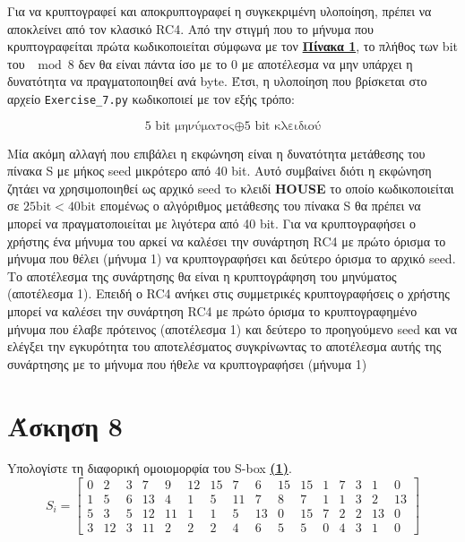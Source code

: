 \documentclass[12pt]{article}
\begin{document}
Για να κρυπτογραφεί και αποκρυπτογραφεί η συγκεκριμένη υλοποίηση, πρέπει να αποκλείνει από τον κλασικό RC4. Από την στιγμή που το μήνυμα που κρυπτογραφείται πρώτα κωδικοποιείται σύμφωνα με τον \textbf{\protect\hyperref[πίνακας 1]{Πίνακα 1}}, το πλήθος των bit του \( \mod 8\) δεν θα είναι πάντα ίσο με το 0 με αποτέλεσμα να μην υπάρχει η δυνατότητα να πραγματοποιηθεί \oplus ανά byte. Έτσι, η υλοποίηση που βρίσκεται στο αρχείο \texttt{Exercise\_7.py} κωδικοποιεί με τον εξής τρόπο: 
\begin{center}
    \begin{equation*}
        \text{5 bit μηνύματος} \oplus \text{5 bit κλειδιού}
    \end{equation*}
\end{center}
Μία ακόμη αλλαγή που επιβάλει η εκφώνηση είναι η δυνατότητα μετάθεσης του πίνακα S με μήκος seed μικρότερο από 40 bit. Αυτό συμβαίνει διότι η εκφώνηση ζητάει να χρησιμοποιηθεί ως αρχικό seed τo κλειδί \textbf{HOUSE} το οποίο κωδικοποιείται σε 
\newline
\( 25 \text{bit} < 40 \text{bit} \) επομένως ο αλγόριθμος μετάθεσης του πίνακα S θα πρέπει να μπορεί να πραγματοποιείται με λιγότερα από 40 bit.
\newline
\newline
Για να κρυπτογραφήσει ο χρήστης ένα μήνυμα του αρκεί να καλέσει την συνάρτηση RC4 με πρώτο όρισμα το μήνυμα που θέλει (μήνυμα 1) να κρυπτογραφήσει και δεύτερο όρισμα το αρχικό seed. Το αποτέλεσμα της συνάρτησης θα είναι η κρυπτογράφηση του μηνύματος (αποτέλεσμα 1).
\newline
\newline
Επειδή ο RC4 ανήκει στις συμμετρικές κρυπτογραφήσεις ο χρήστης μπορεί να καλέσει την συνάρτηση RC4 με πρώτο όρισμα το κρυπτογραφημένο μήνυμα που έλαβε πρότεινος (αποτέλεσμα 1) και δεύτερο το προηγούμενο seed και να ελέγξει την εγκυρότητα του αποτελέσματος συγκρίνωντας το αποτέλεσμα αυτής της συνάρτησης με το μήνυμα που ήθελε να κρυπτογραφήσει (μήνυμα 1) 
\hfill \blacksquare

\section*{Άσκηση 8}
Yπολογίστε τη διαφορική ομοιομορφία του S-box \textbf{\protect\hyperref[sbox 1]{(1)}}.
\begin{equation}
\label{sbox 1}
    S_i =
    \left[
    \begin{array}{cccccccccccccccc}
    0  & 2  & 3  & 7  & 9  & 12 & 15 & 7  & 6  & 15 & 15 & 1  & 7  & 3  & 1  & 0  \\
    1  & 5  & 6  & 13 & 4  & 1  & 5  & 11 & 7  & 8  & 7  & 1  & 1  & 3  & 2  & 13 \\
    5  & 3  & 5  & 12 & 11 & 1  & 1  & 5  & 13 & 0  & 15 & 7  & 2  & 2  & 13 & 0  \\
    3  & 12 & 3  & 11 & 2  & 2  & 2  & 4  & 6  & 5  & 5  & 0  & 4  & 3  & 1  & 0  
    \end{array}
    \right]
\end{equation}
\end{document}
